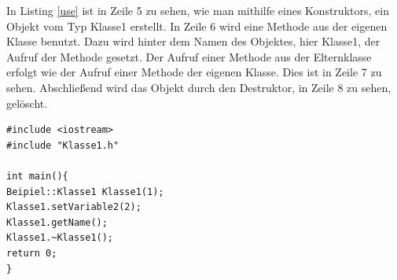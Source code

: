 In Listing \ref{use} ist in Zeile 5  zu sehen, wie man mithilfe eines Konstruktors, ein Objekt vom Typ Klasse1 erstellt. In Zeile 6 wird eine Methode aus der eigenen Klasse benutzt. Dazu wird hinter dem Namen des Objektes, hier \glqq Klasse1\grqq{}, der Aufruf der Methode gesetzt. Der Aufruf einer Methode aus der Elternklasse erfolgt wie der Aufruf einer Methode der eigenen Klasse. Dies ist in Zeile 7 zu sehen. Abschließend wird das Objekt durch den Destruktor, in Zeile 8 zu sehen, gelöscht. 
\begin{lstlisting}[caption = Benutzung der Klasse,label=use]
#include <iostream>
#include "Klasse1.h"

int main(){
Beipiel::Klasse1 Klasse1(1);
Klasse1.setVariable2(2);
Klasse1.getName();
Klasse1.~Klasse1();
return 0;
}
\end{lstlisting}
\cite{HelmutErlenkotter.}
\cite{Prof.Dr.AlfredIrber.}
\cite{Krau.}
